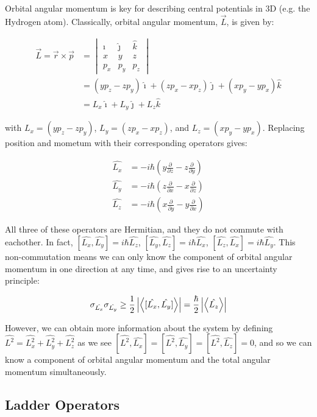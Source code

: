 Orbital angular momentum is key for describing central potentials in 3D (e.g. the Hydrogen atom). Classically, orbital angular momentum, $\vec{L}$, is given by:

\begin{align*} \vec{L} = \vec{r} \times \vec{p} &= \begin{vmatrix} \hat{\imath} & \hat{\jmath} & \hat{k} \\ x & y & z \\ p_x & p_y & p_z \end{vmatrix} \\ &= (yp_z - zp_y)\hat{\imath} + (zp_x - xp_z)\hat{\jmath} + (xp_y - yp_x)\hat{k} \\ &= L_x \hat{\imath} + L_y \hat{\jmath} + L_z \hat{k} \end{align*}

with $L_x = (yp_z - zp_y)$, $L_y = (zp_x - xp_z)$, and $L_z = (xp_y - yp_x)$. Replacing position and mometum with their corresponding operators gives:

\begin{align*}
\hat{L_x} &= -i\hbar\left(y\frac{\partial}{\partial z} - z\frac{\partial}{\partial y}\right) \\
\hat{L_y} &= -i\hbar\left(z\frac{\partial}{\partial x} - x\frac{\partial}{\partial z}\right) \\
\hat{L_z} &= -i\hbar\left(x\frac{\partial}{\partial y} - y\frac{\partial}{\partial x}\right) 
\end{align*}

All three of these operators are Hermitian, and they do not commute with eachother. In fact, $[\hat{L_x}, \hat{L_y}] = i\hbar\hat{L_z}$, $[\hat{L_y}, \hat{L_z}] = i\hbar\hat{L_x}$, $[\hat{L_z}, \hat{L_x}] = i\hbar\hat{L_y}$. This non-commutation means we can only know the component of orbital angular momentum in one direction at any time, and gives rise to an uncertainty principle:

\[ \sigma_{\hat{L_x}}\sigma_{\hat{L_y}} \geq \frac{1}{2}\left|\expval{[\hat{L_x},\hat{L_y}]}\right| = \frac{\hbar}{2}\left|\expval{\hat{L_z}}\right| \]

However, we can obtain more information about the system by defining $\hat{L^2} = \hat{L_x^2} + \hat{L_y^2} + \hat{L_z^2}$ as we see $[\hat{L^2},\hat{L_x}] = [\hat{L^2}, \hat{L_y}] = [\hat{L^2}, \hat{L_z}] = 0$, and so we can know a component of orbital angular momentum and the total angular momentum simultaneously. 
\subsection{Ladder Operators}